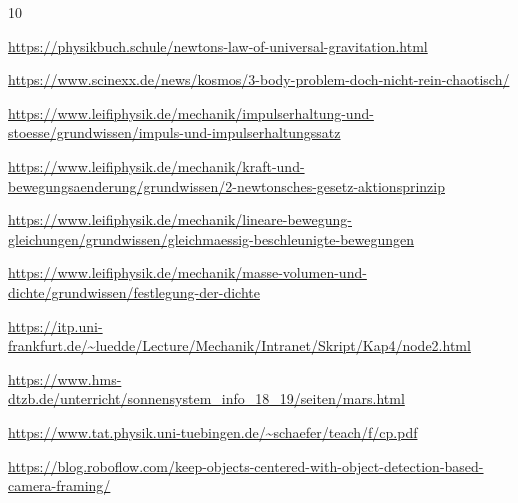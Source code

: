 \documentclass[11pt]{article}
\begin{document}
\begin{thebibliography}{10} %

\url{https://physikbuch.schule/newtons-law-of-universal-gravitation.html}

\url{https://www.scinexx.de/news/kosmos/3-body-problem-doch-nicht-rein-chaotisch/}

\url{https://www.leifiphysik.de/mechanik/impulserhaltung-und-stoesse/grundwissen/impuls-und-impulserhaltungssatz}

\url{https://www.leifiphysik.de/mechanik/kraft-und-bewegungsaenderung/grundwissen/2-newtonsches-gesetz-aktionsprinzip}

\url{https://www.leifiphysik.de/mechanik/lineare-bewegung-gleichungen/grundwissen/gleichmaessig-beschleunigte-bewegungen}

\url{https://www.leifiphysik.de/mechanik/masse-volumen-und-dichte/grundwissen/festlegung-der-dichte}

\url{https://itp.uni-frankfurt.de/~luedde/Lecture/Mechanik/Intranet/Skript/Kap4/node2.html}

\url{https://www.hms-dtzb.de/unterricht/sonnensystem_info_18_19/seiten/mars.html}

\url{https://www.tat.physik.uni-tuebingen.de/~schaefer/teach/f/cp.pdf}

\url{https://blog.roboflow.com/keep-objects-centered-with-object-detection-based-camera-framing/}

\end{thebibliography}

    
    
    
\end{document}
